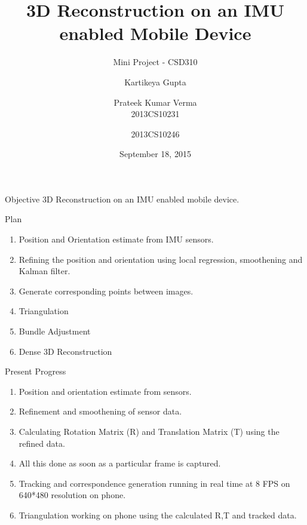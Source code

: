 \documentclass{beamer}
\title[3D reconstruction]{3D Reconstruction on an IMU enabled Mobile Device}
\subtitle{Mini Project - CSD310}
\author[Kartikeya \and Prateek]{\hspace{.063\textwidth} Kartikeya Gupta \and Prateek Kumar Verma \\\small 2013CS10231 \hspace{.1\textwidth} \and \small 2013CS10246}
\institute[IITD] %
{
  Department of Computer Science and Engineering\\
  IIT Delhi
  \and
  Under supervision of \\
  \textbf{Prof. Subhashis Banerjee} \\
  Department of Computer Science and Engineering
}
\date{September 18, 2015}
\begin{document}
\begin{frame}
  \titlepage
\end{frame}

\begin{frame}{Objective}
  3D Reconstruction on an IMU enabled mobile device.

\end{frame}



\begin{frame}{Plan}{}
  \begin{enumerate}
  	\item Position and Orientation estimate from IMU sensors.
  	\item Refining the position and orientation using local regression, smoothening and Kalman filter.
  	\item Generate corresponding points between images.
  	\item Triangulation
  	\item Bundle Adjustment
  	\item Dense 3D Reconstruction
  \end{enumerate}
\end{frame}

\begin{frame}{Present Progress}{}
	\begin{enumerate}
		\item Position and orientation estimate from sensors.
    \item Refinement and smoothening of sensor data. 
    \item Calculating Rotation Matrix (R) and Translation Matrix (T) using the refined data.
    \item All this done as soon as a particular frame is captured.
		\item Tracking and correspondence generation running in real time at 8 FPS on 640*480 resolution on phone.
		\item Triangulation working on phone using the calculated R,T and tracked data.
	\end{enumerate}
\end{frame}
\end{document}
